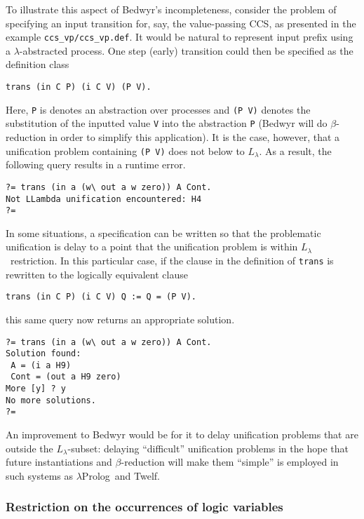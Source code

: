 \documentclass{article}
\newcommand{\lp}{$\lambda$Prolog}
\newcommand{\Ll}{$L_\lambda$}
\begin{document}
To illustrate this aspect of Bedwyr's incompleteness, consider the
problem of specifying an input transition for, say, the value-passing
CCS, as presented in the example \verb+ccs_vp/ccs_vp.def+.  It would
be natural to represent input prefix using a $\lambda$-abstracted
process.  One step (early) transition could then be specified as the
definition class
\begin{verbatim}
trans (in C P) (i C V) (P V).
\end{verbatim}
Here, {\tt P} is denotes an abstraction over processes and
\verb+(P V)+ denotes the substitution of the inputted value {\tt V}
into the abstraction {\tt P} (Bedwyr will do $\beta$-reduction in order
to simplify this application).  It is the case, however, that a
unification problem containing \verb+(P V)+ does not below to \Ll.
As a result, the following query results in a runtime error.
\begin{verbatim}
?= trans (in a (w\ out a w zero)) A Cont.
Not LLambda unification encountered: H4
?= 
\end{verbatim}
In some situations, a specification can be written so that the
problematic unification is delay to a point that the unification
problem is within \Ll\ restriction.  In this particular case, if the clause
in the definition of {\tt trans} is rewritten to the logically
equivalent clause
\begin{verbatim}
trans (in C P) (i C V) Q := Q = (P V).
\end{verbatim}
this same query now returns an appropriate solution.
\begin{verbatim}
?= trans (in a (w\ out a w zero)) A Cont.
Solution found:
 A = (i a H9)
 Cont = (out a H9 zero)
More [y] ? y
No more solutions.
?= 
\end{verbatim}
An improvement to Bedwyr would be for it to delay unification problems
that are outside the \Ll-subset: delaying ``difficult'' unification
problems in the hope that future instantiations and $\beta$-reduction
will make them ``simple'' is employed in such systems as \lp\ and
Twelf.

\subsubsection{Restriction on the occurrences of logic variables}
\end{document}
